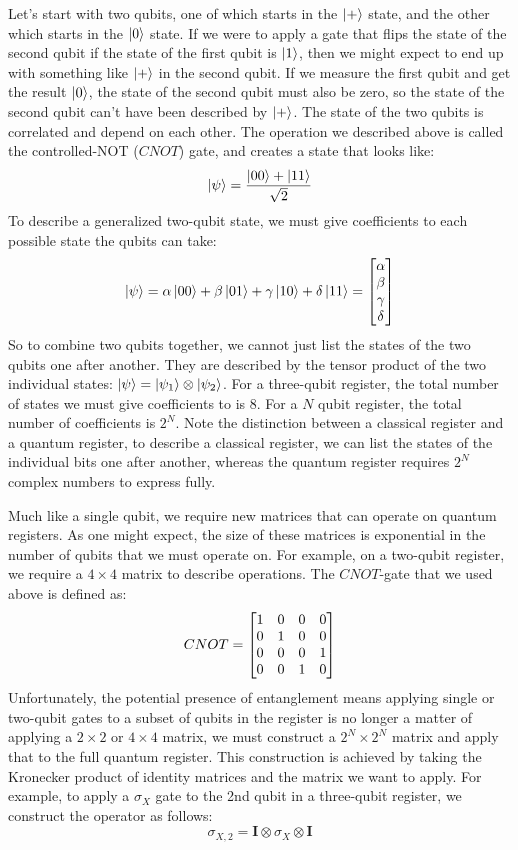 Let's start with two qubits, one of which starts in the $\ket{+}$ state, and the other which starts in
the $\ket{0}$ state. If we were to apply a gate that flips the state of the second qubit if the state of
the first qubit is $\ket{1}$, then we might expect to end up with something like $\ket{+}$ in the second
qubit. If we measure the first qubit and get the result $\ket{0}$, the state of the second qubit must also
be zero, so the state of the second qubit can't have been described by $\ket{+}$. The state of the two
qubits is correlated and depend on each other. The operation we described above is called the
controlled-NOT ($CNOT$) gate, and creates a state that looks like:
\begin{equation}
  \ket{\psi} = \frac{\ket{00} + \ket{11}}{\sqrt{2}}
\end{equation}
To describe a generalized two-qubit state, we must give coefficients to each possible state the qubits
can take:
\begin{equation}
  \ket{\psi} = \alpha\ket{00} + \beta\ket{01} + \gamma\ket{10} + \delta\ket{11} =
    \begin{bmatrix}\alpha\\\beta\\\gamma\\\delta\end{bmatrix}
\end{equation}
So to combine two qubits together, we cannot just list the states of the two qubits one after another.
They are described by the tensor product of the two individual states: $\ket{\psi} = \ket{\psi_1}\otimes\ket{\psi_2}$.
For a three-qubit register, the total number of states we must give coefficients to is 8. For a $N$ qubit
register, the total number of coefficients is $2^N$. Note the distinction between a classical register
and a quantum register, to describe a classical register, we can list the states of the individual
bits one after another, whereas the quantum register requires $2^N$ complex numbers to express fully.

Much like a single qubit, we require new matrices that can operate on quantum registers. As one
might expect, the size of these matrices is exponential in the number of qubits that we must operate on.
For example, on a two-qubit register, we require a $4 \times 4$ matrix to describe operations. The
$CNOT$-gate that we used above is defined as:
\begin{equation}
  CNOT = \begin{bmatrix}1&0&0&0\\0&1&0&0\\0&0&0&1\\0&0&1&0\end{bmatrix}
\end{equation}
Unfortunately, the potential presence of entanglement means applying single or two-qubit gates to a subset
of qubits in the register is no longer a matter of applying a $2 \times 2$ or $4 \times 4$ matrix, we must
construct a $2^N \times 2^N$ matrix and apply that to the full quantum register. This construction is achieved
by taking the Kronecker product of identity matrices and the matrix we want to apply. For example, to apply
a $\sigma_X$ gate to the 2nd qubit in a three-qubit register, we construct the operator as follows:
\begin{equation}
  \sigma_{X,2} = \boldsymbol{I} \otimes \sigma_X \otimes \boldsymbol{I}
\end{equation}

